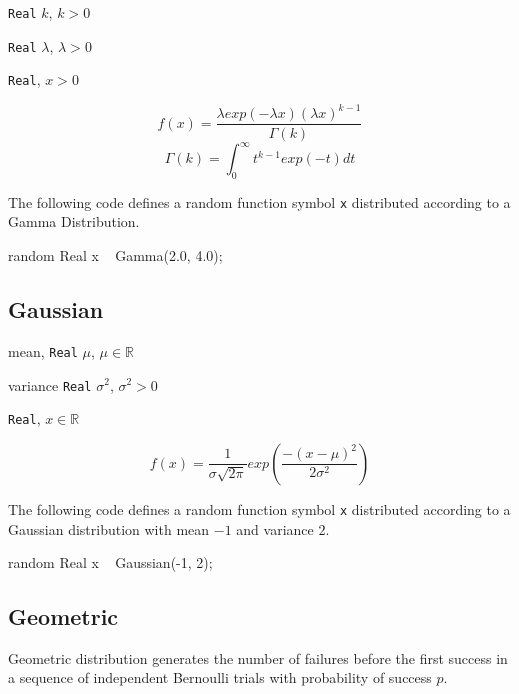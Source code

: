\begin{itemize*}
\item[] \verb|Real| $k$, $k > 0$
\item[] \verb|Real| $\lambda$, $\lambda > 0$
\end{itemize*}

\begin{itemize*}
\item[] \verb|Real|, $x > 0$
\end{itemize*}

\[
	f(x) = \frac{\lambda exp(-\lambda x) (\lambda x)^{k-1}}{\Gamma(k)}
\]
\[
	\Gamma(k) = \int_{0}^{\infty} t^{k-1}exp(-t) dt
\]

The following code defines a random function symbol \verb|x| distributed according to a Gamma Distribution.
\begin{blogcode}
random Real x ~ Gamma(2.0, 4.0);
\end{blogcode}

\subsection{Gaussian}

\begin{itemize*}
\item[] mean, \verb|Real|
 $\mu$, $\mu \in \mathbb{R}$
\item[] variance \verb|Real|
 $\sigma^2$, $\sigma^2 > 0$
\end{itemize*}

\begin{itemize*}
\item[] \verb|Real|, $x \in \mathbb{R}$
\end{itemize*}

\[
	f(x) = \frac{1}{\sigma \sqrt{2 \pi}} exp(\frac{-(x-\mu)^{2}}{2 \sigma^{2}})
\]

The following code defines a random function symbol \verb|x| distributed according to a Gaussian distribution with mean $-1$ and variance $2$.
\begin{blogcode}
random Real x ~ Gaussian(-1, 2);
\end{blogcode}

\subsection{Geometric}
Geometric distribution generates the number of failures before the first success in a sequence of independent Bernoulli trials with probability of success $p$.

